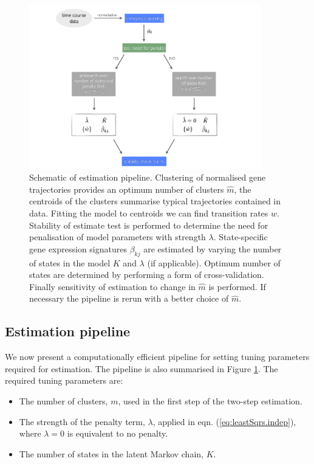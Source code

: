 \begin{figure}
  \centering
  \includegraphics[width=0.9\textwidth]{pics/pipeline.pdf}
  \caption{Schematic of estimation pipeline. Clustering of normalised gene trajectories provides an optimum number of clusters $\hat{m}$, the centroids of the clusters summarise typical trajectories contained in data. Fitting the model to centroids we can find transition rates $w$. Stability of estimate test is performed to determine the need for penalisation of model parameters with strength $\lambda$. State-specific gene expression signatures $\beta_{kj}$ are estimated by varying the number of states in the model $K$ and $\lambda$ (if applicable). Optimum number of states are determined by performing a form of cross-validation. Finally sensitivity of estimation to change in $\hat{m}$ is performed. If necessary the pipeline is rerun with a better choice of $\hat{m}$.}
  \label{fig:pipeline}
\end{figure}

\subsection{Estimation pipeline}
\label{sec:estim-pipe}

We now present a computationally efficient pipeline for setting tuning parameters required for estimation. The pipeline is also summarised in Figure \ref{fig:pipeline}. The required tuning parameters are:

\begin{itemize}
\item The number of clusters, $m$, used in the first step of the two-step estimation.
\item The strength of the penalty term, $\lambda$, applied in eqn. (\ref{eq:leastSqrs.indep}), where $\lambda=0$ is equivalent to no penalty.
\item The number of states in the latent Markov chain, $K$.
\end{itemize}

